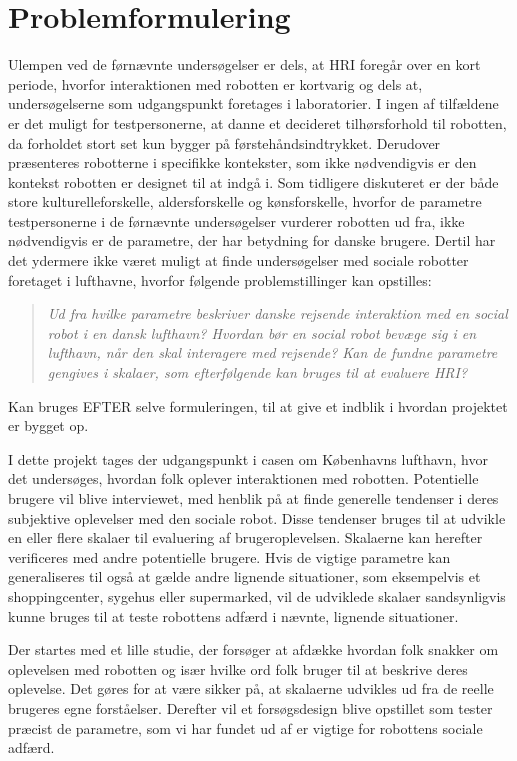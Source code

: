 \section{Problemformulering}
\label{Problemformulering}
%
Ulempen ved de førnævnte undersøgelser er dels, at HRI foregår over en kort periode, hvorfor interaktionen med robotten er kortvarig og dels at, undersøgelserne som udgangspunkt foretages i laboratorier. I ingen af tilfældene er det muligt for testpersonerne, at danne et decideret tilhørsforhold til robotten, da forholdet stort set kun bygger på førstehåndsindtrykket. Derudover præsenteres robotterne i specifikke kontekster, som ikke nødvendigvis er den kontekst robotten er designet til at indgå i. Som tidligere diskuteret er der både store kulturelleforskelle, aldersforskelle og kønsforskelle, hvorfor de parametre testpersonerne i de førnævnte undersøgelser vurderer robotten ud fra, ikke nødvendigvis er de parametre, der har betydning for danske brugere. Dertil har det ydermere ikke været muligt at finde undersøgelser med sociale robotter foretaget i lufthavne, hvorfor følgende problemstillinger kan opstilles:\blankline
%
\begin{quotation}
	\noindent
	\textit{Ud fra hvilke parametre beskriver danske rejsende interaktion med en social robot i en dansk lufthavn?\blankline
		Hvordan bør en social robot bevæge sig i en lufthavn, når den skal interagere med rejsende?\blankline
		Kan de fundne parametre gengives i skalaer, som efterfølgende kan bruges til at evaluere HRI?}\blankline
\end{quotation}
%





Kan bruges EFTER selve formuleringen, til at give et indblik i hvordan projektet er bygget op. 

I dette projekt tages der udgangspunkt i casen om Københavns lufthavn, hvor det undersøges, hvordan folk oplever interaktionen med robotten. Potentielle brugere vil blive interviewet, med henblik på at finde generelle tendenser i deres subjektive oplevelser med den sociale robot. Disse tendenser bruges til at udvikle en eller flere skalaer til evaluering af brugeroplevelsen. Skalaerne kan herefter verificeres med andre potentielle brugere. Hvis de vigtige parametre kan generaliseres til også at gælde andre lignende situationer, som eksempelvis et shoppingcenter, sygehus eller supermarked, vil de udviklede skalaer sandsynligvis kunne bruges til at teste robottens adfærd i nævnte, lignende situationer.

Der startes med et lille studie, der forsøger at afdække hvordan folk snakker om oplevelsen med robotten og især hvilke ord folk bruger til at beskrive deres oplevelse. Det gøres for at være sikker på, at skalaerne udvikles ud fra de reelle brugeres egne forståelser. Derefter vil et forsøgsdesign blive opstillet som tester præcist de parametre, som vi har fundet ud af er vigtige for robottens sociale adfærd.